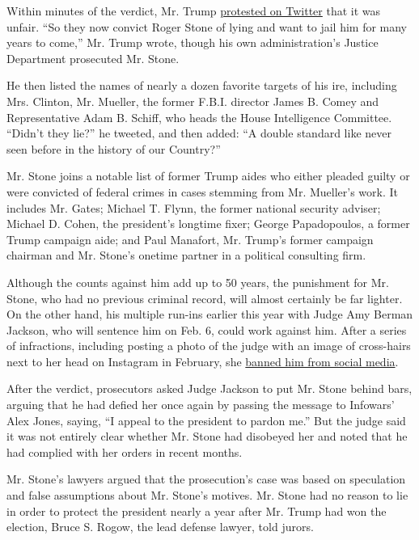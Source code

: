 Within minutes of the verdict, Mr. Trump
\href{https://twitter.com/realDonaldTrump/status/1195389483664990208}{protested
on Twitter} that it was unfair. ``So they now convict Roger Stone of
lying and want to jail him for many years to come,'' Mr. Trump wrote,
though his own administration's Justice Department prosecuted Mr. Stone.

He then listed the names of nearly a dozen favorite targets of his ire,
including Mrs. Clinton, Mr. Mueller, the former F.B.I. director James B.
Comey and Representative Adam B. Schiff, who heads the House
Intelligence Committee. ``Didn't they lie?'' he tweeted, and then added:
``A double standard like never seen before in the history of our
Country?''

Mr. Stone joins a notable list of former Trump aides who either pleaded
guilty or were convicted of federal crimes in cases stemming from Mr.
Mueller's work. It includes Mr. Gates; Michael T. Flynn, the former
national security adviser; Michael D. Cohen, the president's longtime
fixer; George Papadopoulos, a former Trump campaign aide; and Paul
Manafort, Mr. Trump's former campaign chairman and Mr. Stone's onetime
partner in a political consulting firm.

Although the counts against him add up to 50 years, the punishment for
Mr. Stone, who had no previous criminal record, will almost certainly be
far lighter. On the other hand, his multiple run-ins earlier this year
with Judge Amy Berman Jackson, who will sentence him on Feb. 6, could
work against him. After a series of infractions, including posting a
photo of the judge with an image of cross-hairs next to her head on
Instagram in February, she
\href{https://www.nytimes.com/2019/07/16/us/politics/roger-stone-gag-order.html}{banned
him from social media}.

After the verdict, prosecutors asked Judge Jackson to put Mr. Stone
behind bars, arguing that he had defied her once again by passing the
message to Infowars' Alex Jones, saying, ``I appeal to the president to
pardon me.'' But the judge said it was not entirely clear whether Mr.
Stone had disobeyed her and noted that he had complied with her orders
in recent months.

Mr. Stone's lawyers argued that the prosecution's case was based on
speculation and false assumptions about Mr. Stone's motives. Mr. Stone
had no reason to lie in order to protect the president nearly a year
after Mr. Trump had won the election, Bruce S. Rogow, the lead defense
lawyer, told jurors.

